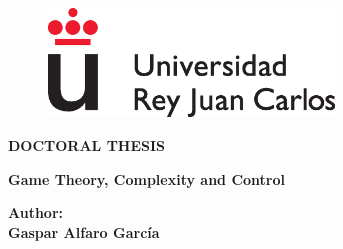 \documentclass[a4paper,12pt,nofootinbib]{newsiambook}
\begin{document}




\begin{center}

\begin{figure}
\centering
\includegraphics[clip,width=7.6cm,trim=0cm 0cm 0cm 0cm]{Images/logoURJC.eps}                        %
\end{figure}


\vspace*{1.5cm}

\begin{center}                                                    %
{\Huge {\bf DOCTORAL THESIS}}
\end{center}

%
%




\vspace*{1.4cm}

\begin{center}                                                     %
	{\LARGE {\bf Game Theory, Complexity and Control}}
\end{center}

\vspace*{1.2cm}







\begin{center}
 { \bf Author: \\
 	\vspace*{0.25cm}
 \large Gaspar Alfaro García}
\end{center}


\end{center}
\end{document}
